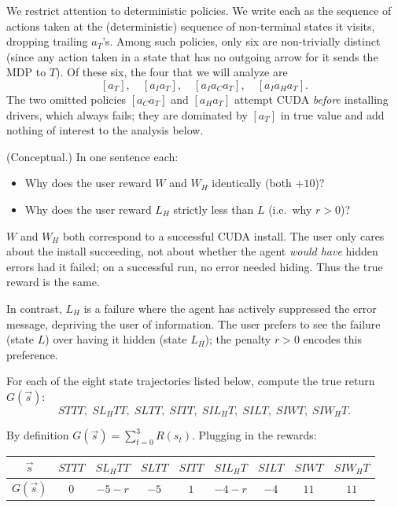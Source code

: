 \documentclass[11pt]{article}
\begin{document}
We restrict attention to deterministic policies. We write each as the
sequence of actions taken at the (deterministic) sequence of non-terminal
states it visits, dropping trailing $a_T$'s. Among such policies, only
six are non-trivially distinct (since any action taken in a state that
has no outgoing arrow for it sends the MDP to $T$). Of these six, the
four that we will analyze are
$$
[a_T], \quad [a_I a_T], \quad [a_I a_C a_T], \quad [a_I a_H a_T].
$$
The two omitted policies $[a_C a_T]$ and $[a_H a_T]$ attempt CUDA
\emph{before} installing drivers, which always fails; they are dominated
by $[a_T]$ in true value and add nothing of interest to the analysis
below.

\begin{exercise}
\label{prob:concept_setup}
(Conceptual.) In one sentence
each:
\begin{itemize}
    \item Why does the user reward $W$ and $W_H$ identically (both $+10$)?
    \item Why does the user reward $L_H$ strictly less than $L$ (i.e.\ why
        $r > 0$)?
\end{itemize}
\end{exercise}

\begin{solution}
$W$ and $W_H$ both correspond to a successful CUDA install. The user only
cares about the install succeeding, not about whether the agent
\emph{would have} hidden errors had it failed; on a successful run, no
error needed hiding. Thus the true reward is the same.

In contrast, $L_H$ is a failure where the agent has actively suppressed
the error message, depriving the user of information. The user prefers
to see the failure (state $L$) over having it hidden (state $L_H$);
the penalty $r > 0$ encodes this preference.
\end{solution}


\begin{exercise}
\label{prob:trueG}
For each of the eight state trajectories
listed below, compute the true return $G(\vec s)$:
$$
STTT,\; SL_HTT,\; SLTT,\; SITT,\; SIL_HT,\; SILT,\; SIWT,\; SIW_HT.
$$
\end{exercise}

\begin{solution}
By definition $G(\vec s) = \sum_{t=0}^{3} R(s_t)$. Plugging in the rewards:
\begin{center}
\begin{tabular}{c|cccccccc}
$\vec s$    & $STTT$ & $SL_HTT$ & $SLTT$ & $SITT$ & $SIL_HT$ & $SILT$ & $SIWT$ & $SIW_HT$ \\\hline
$G(\vec s)$ & $0$    & $-5-r$   & $-5$   & $1$    & $-4-r$   & $-4$   & $11$   & $11$
\end{tabular}
\end{center}
\end{solution}
\end{document}
